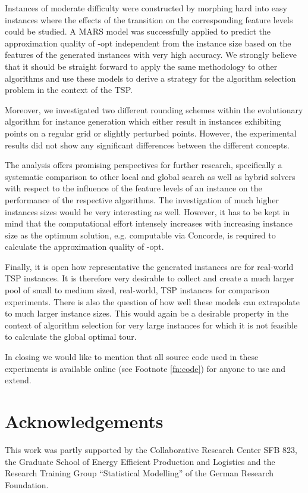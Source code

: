 \documentclass{article}
\begin{document}
Instances of moderate difficulty were constructed by morphing hard
into easy instances where the effects of the transition on the
corresponding feature levels could be studied. A MARS model was
successfully applied to predict the approximation quality of -opt
independent from the instance size based on the features of the
generated instances with very high accuracy. We strongly believe that
it should be straight forward to apply the same methodology to other
algorithms and use these models to derive a strategy for the algorithm
selection problem in the context of the TSP.

Moreover, we investigated two different rounding schemes within the
evolutionary algorithm for instance generation which either result in
instances exhibiting points on a regular grid or slightly perturbed
points. However, the experimental results did not show any significant
differences between the different concepts.

The analysis offers promising perspectives for further research,
specifically a systematic comparison to other local and global search
as well as hybrid solvers with respect to the influence of the feature
levels of an instance on the performance of the respective algorithms.
The investigation of much higher instances sizes would be very
interesting as well. However, it has to be kept in mind that the
computational effort intensely increases with increasing instance size
as the optimum solution, e.g. computable via Concorde, is required to
calculate the approximation quality of -opt.

Finally, it is open how representative the generated instances are for
real-world TSP instances. It is therefore very desirable to collect
and create a much larger pool of small to medium sized, real-world,
TSP instances for comparison experiments. There is also the question
of how well these models can extrapolate to much larger instance
sizes. This would again be a desirable property in the context of
algorithm selection for very large instances for which it is not
feasible to calculate the global optimal tour.

In closing we would like to mention that all source code used in these experiments is available online (see Footnote \ref{fn:code}) for anyone to use and extend.



\section*{Acknowledgements}
  This work was partly supported by the Collaborative Research Center
  SFB 823, the Graduate School of Energy Efficient Production and
  Logistics and the Research Training Group ``Statistical Modelling''
  of the German Research Foundation.



\end{document}
